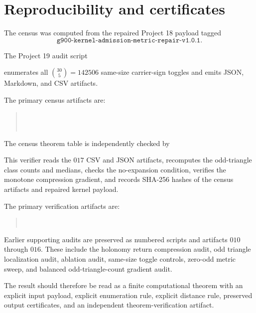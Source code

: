 \section{Reproducibility and certificates}

The census was computed from the repaired Project 18 payload tagged
\[
    \texttt{g900-kernel-admission-metric-repair-v1.0.1}.
\]

The Project 19 audit script
\begin{quote}
\end{quote}
enumerates all \(\binom{30}{5}=142506\) same-size carrier-sign toggles and emits JSON, Markdown, and CSV artifacts.

The primary census artifacts are:
\begin{quote}
\\
\\
\end{quote}

The census theorem table is independently checked by
\begin{quote}
\end{quote}
This verifier reads the \(017\) CSV and JSON artifacts, recomputes the odd-triangle class counts and medians, checks the no-expansion condition, verifies the monotone compression gradient, and records SHA-256 hashes of the census artifacts and repaired kernel payload.

The primary verification artifacts are:
\begin{quote}
\\
\end{quote}

Earlier supporting audits are preserved as numbered scripts and artifacts \(010\) through \(016\). These include the holonomy return compression audit, odd triangle localization audit, ablation audit, same-size toggle controls, zero-odd metric sweep, and balanced odd-triangle-count gradient audit.

The result should therefore be read as a finite computational theorem with an explicit input payload, explicit enumeration rule, explicit distance rule, preserved output certificates, and an independent theorem-verification artifact.
